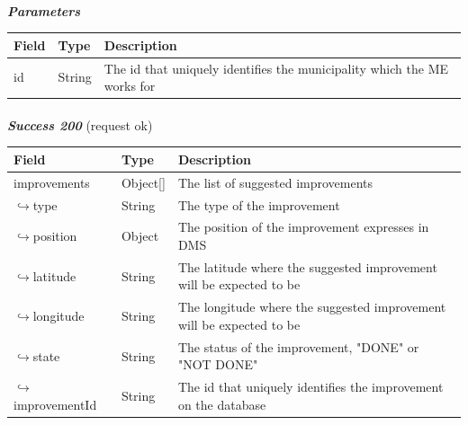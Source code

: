 						\paragraph{}
							\textcolor{myBlue}{\textit{\textbf{Parameters}}}
							\vspace{-2mm}
							\begin{table}[!h]
								\begin{tabular}{L{0.15\textwidth}L{0.15\textwidth}L{0.58\textwidth}}
									\toprule
									\textbf{Field} & \textbf{Type} & \textbf{Description} \\
									\midrule
								 	id & String & The id that uniquely identifies the municipality which the ME works for \\
								 	\bottomrule
								\end{tabular}
							\end{table}
						\paragraph{}
							\textcolor{myGreen}{\textit{\textbf{Success 200}}} (request ok)
							\vspace{-2mm}
							\begin{table}[!h]
								\begin{tabular}{L{0.3\textwidth}L{0.15\textwidth}L{0.43\textwidth}}
									\toprule
									\textbf{Field} & \textbf{Type} & \textbf{Description} \\
									\midrule
									improvements & Object[] & The list of suggested improvements \\
									\hspace{2.5mm}$\hookrightarrow$type & String & The type of the improvement\\
									\hspace{2.5mm}$\hookrightarrow$position & Object & The position of the improvement expresses in DMS \\
									\hspace{6.5mm}$\hookrightarrow$latitude & String & The latitude where the suggested improvement will be expected to be \\
									\hspace{6.5mm}$\hookrightarrow$longitude & String & The longitude where the suggested improvement will be expected to be  \\
									\hspace{2.5mm}$\hookrightarrow$state & String & The status of the improvement, "DONE" or "NOT DONE" \\
									\hspace{2.5mm}$\hookrightarrow$improvementId & String & The id that uniquely identifies the improvement on the database \\
								 	\bottomrule
								\end{tabular}
							\end{table}
						\vspace{-5mm}
